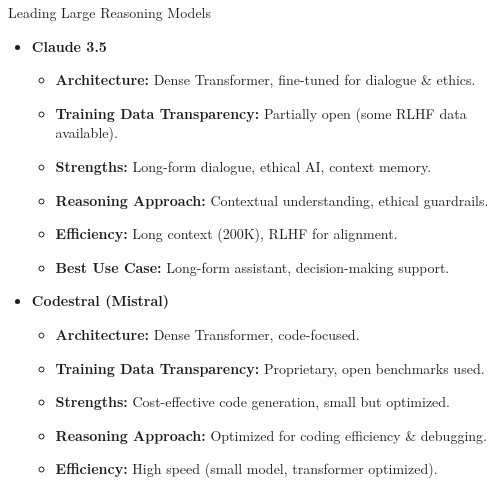 \begin{frame}[allowframebreaks]{Leading Large Reasoning Models}
\begin{itemize}
\begin{itemize}
            \item \textbf{Architecture:} Multimodal Transformer (Text+Image+Speech).
            \item \textbf{Training Data Transparency:} Proprietary, multimodal (text, images, APIs).
            \item \textbf{Strengths:} Multimodal (images, text, speech), deep reasoning.
            \item \textbf{Reasoning Approach:} Flash Thinking mode (transparent thought process).
            \item \textbf{Efficiency:} 1M token context (experimental), optimized for speed.
            \item \textbf{Best Use Case:} AI assistant (multimodal, research, planning).
        \end{itemize}
    \framebreak
        \item \textbf{Claude 3.5}
        \begin{itemize}
            \item \textbf{Architecture:} Dense Transformer, fine-tuned for dialogue \& ethics.
            \item \textbf{Training Data Transparency:} Partially open (some RLHF data available).
            \item \textbf{Strengths:} Long-form dialogue, ethical AI, context memory.
            \item \textbf{Reasoning Approach:} Contextual understanding, ethical guardrails.
            \item \textbf{Efficiency:} Long context (200K), RLHF for alignment.
            \item \textbf{Best Use Case:} Long-form assistant, decision-making support.
        \end{itemize}
    \framebreak
        \item \textbf{Codestral (Mistral)}
        \begin{itemize}
            \item \textbf{Architecture:} Dense Transformer, code-focused.
            \item \textbf{Training Data Transparency:} Proprietary, open benchmarks used.
            \item \textbf{Strengths:} Cost-effective code generation, small but optimized.
            \item \textbf{Reasoning Approach:} Optimized for coding efficiency \& debugging.
            \item \textbf{Efficiency:} High speed (small model, transformer optimized).

\end{itemize}
\end{itemize}
\end{frame}
